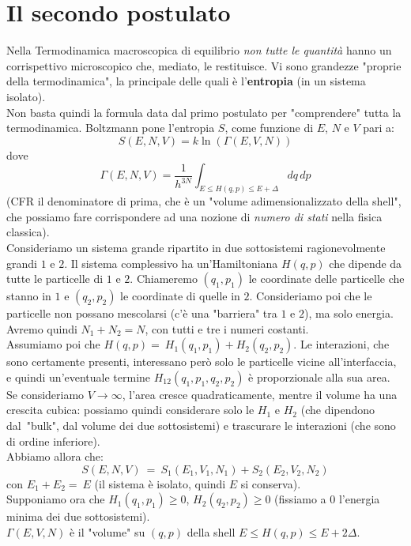 \documentclass[12pt]{article}
\begin{document}
\section{Il secondo postulato}
Nella Termodinamica macroscopica di equilibrio \textit{non tutte le quantità} hanno un corrispettivo microscopico che, mediato, le restituisce. Vi sono grandezze "proprie della termodinamica", la principale delle quali è l'\textbf{entropia} (in un sistema isolato).\\
Non basta quindi la formula data dal primo postulato per "comprendere" tutta la termodinamica. Boltzmann pone l'entropia $S$, come funzione di $E$, $N$ e $V$ pari a:
\[
S(E,N,V) =k \ln \left (\Gamma(E,V,N) \right)
\]
dove
\[
\Gamma(E,N,V) =\frac{1}{h^{3N}}\int_{E\leq H(q,p)\leq E+\Delta} dq\,dp
\]
(CFR il denominatore di prima, che è un "volume adimensionalizzato della shell", che possiamo fare corrispondere ad una nozione di \textit{numero di stati} nella fisica classica).\\ %
Consideriamo un sistema grande ripartito in due sottosistemi ragionevolmente grandi $1$ e $2$. Il sistema complessivo ha un'Hamiltoniana $H(q,p)$ che dipende da tutte le particelle di $1$ e $2$. Chiameremo $(q_1,p_1)$ le coordinate delle particelle che stanno in $1$ e $(q_2, p_2)$ le coordinate di quelle in $2$. Consideriamo poi che le particelle non possano mescolarsi (c'è una "barriera" tra $1$ e $2$), ma solo energia.\\
Avremo quindi $N_1+N_2=N$, con tutti e tre i numeri costanti.\\
Assumiamo poi che $H(q,p) =\ H_1(q_1,p_1) + H_2(q_2,p_2)$. Le interazioni, che sono certamente presenti, interessano però solo le particelle vicine all'interfaccia, e quindi un'eventuale termine $H_{12}(q_1, p_1, q_2, p_2)$ è proporzionale alla sua area. Se consideriamo $V \to \infty$, l'area cresce quadraticamente, mentre il volume ha una crescita cubica: possiamo quindi considerare solo le $H_1$ e $H_2$ (che dipendono dal\ "bulk", dal volume dei due sottosistemi) e trascurare le interazioni (che sono di ordine inferiore).\\
Abbiamo allora che:
\[
S(E,N,V)\ =\ S_1(E_1, V_1, N_1) + S_2(E_2, V_2, N_2)
\]
con $E_1 + E_2 =\ E$ (il sistema è isolato, quindi $E$ si conserva).\\
Supponiamo ora che $H_1(q_1, p_1) \geq 0$, $H_2(q_2, p_2) \geq 0$ (fissiamo a $0$ l'energia minima dei due sottosistemi).\\
$
\Gamma(E,V,N)$ è il "volume" su $(q,p)$ della shell $E\leq H(q,p) \leq E+2\Delta$.
\end{document}
